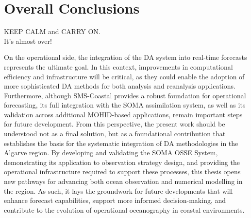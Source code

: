 \chapter{Overall Conclusions} \label{sec:cp5}
\newpage

KEEP CALM and CARRY ON.\\It's almost over!

On the operational side, the integration of the DA system into real-time forecasts represents the ultimate goal. In this context, improvements in computational efficiency and infrastructure will be critical, as they could enable the adoption of more sophisticated DA methods for both analysis and reanalysis applications. Furthermore, although SMS-Coastal provides a robust foundation for operational forecasting, its full integration with the SOMA assimilation system, as well as its validation across additional MOHID-based applications, remain important steps for future development. From this perspective, the present work should be understood not as a final solution, but as a foundational contribution that establishes the basis for the systematic integration of DA methodologies in the Algarve region. By developing and validating the SOMA OSSE System, demonstrating its application to observation strategy design, and providing the operational infrastructure required to support these processes, this thesis opens new pathways for advancing both ocean observation and numerical modelling in the region. As such, it lays the groundwork for future developments that will enhance forecast capabilities, support more informed decision-making, and contribute to the evolution of operational oceanography in coastal environments.
